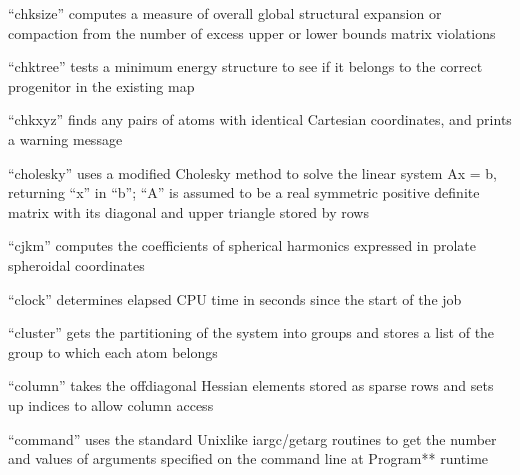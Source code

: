\documentclass[letterpaper,11pt,english]{sphinxmanual}
\begin{document}

“chksize” computes a measure of overall global structural expansion or compaction from the number of excess upper or lower bounds matrix violations


“chktree” tests a minimum energy structure to see if it belongs to the correct progenitor in the existing map


“chkxyz” finds any pairs of atoms with identical Cartesian coordinates, and prints a warning message


“cholesky” uses a modified Cholesky method to solve the linear system Ax = b, returning “x” in “b”; “A” is assumed to be a real symmetric positive definite matrix with its diagonal and upper triangle stored by rows



“cjkm” computes the coefficients of spherical harmonics expressed in prolate spheroidal coordinates







“clock” determines elapsed CPU time in seconds since the start of the job


“cluster” gets the partitioning of the system into groups and stores a list of the group to which each atom belongs


“column” takes the off\sphinxhyphen{}diagonal Hessian elements stored as sparse rows and sets up indices to allow column access


“command” uses the standard Unix\sphinxhyphen{}like iargc/getarg routines to get the number and values of arguments specified on the command line at Program** runtime
\end{document}
